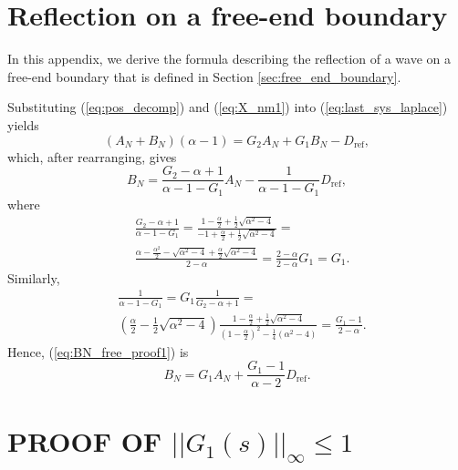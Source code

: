 \documentclass[final,5p,times,twocolumn]{elsarticle}
\begin{document}
\section{Reflection on a free-end boundary}
\label{sec:app_free_end}
In this appendix, we derive the formula describing the reflection of a wave on a free-end boundary that is defined in Section \ref{sec:free_end_boundary}.

Substituting (\ref{eq:pos_decomp}) and (\ref{eq:X_nm1}) into (\ref{eq:last_sys_laplace}) yields
\begin{equation}
  (A_N+B_N) (\alpha -1) = G_2A_N+G_1B_N -D_{\text{ref}},
\end{equation}
which, after rearranging, gives
\begin{equation}
  B_N = \frac{G_2-\alpha+1}{\alpha-1-G_1}A_N - \frac{1}{\alpha-1-G_1}D_{\text{ref}},
  \label{eq:BN_free_proof1}
\end{equation}
where
\begin{align}
  &\frac{G_2-\alpha+1}{\alpha-1-G_1} = \frac{1-\frac{\alpha}{2}+\frac{1}{2}\sqrt{\alpha^2-4}} {-1+\frac{\alpha}{2}+\frac{1}{2}\sqrt{\alpha^2-4}} = \nonumber \\ &\frac{\alpha-\frac{\alpha^2}{2}- \sqrt{\alpha^2-4} +\frac{\alpha}{2}\sqrt{\alpha^2-4}}{2-\alpha} = \frac{2-\alpha}{2-\alpha} G_1 = G_1.
\end{align}
Similarly,
\begin{align}
  &\frac{1}{\alpha-1-G_1} = G_1 \frac{1}{G_2-\alpha+1} = \nonumber \\ &\left(\frac{\alpha}{2}-\frac{1}{2}\sqrt{\alpha^2-4} \right)\frac{1-\frac{\alpha}{2}+\frac{1}{2}\sqrt{\alpha^2-4}}{\left(1-\frac{\alpha}{2} \right)^{2} -\frac{1}{4}(\alpha^2-4)} = \frac{G_1 -1}{2-\alpha}.
\end{align}
Hence, (\ref{eq:BN_free_proof1}) is
\begin{equation}
  B_N = G_1 A_N + \frac{G_1 -1}{\alpha-2} D_{\text{ref}}.
  \label{eq:free_end_appendix}
\end{equation}


\section{PROOF OF $||G_1(s)||_{\infty} \leq 1$}
\label{app:string_stability}
\end{document}
